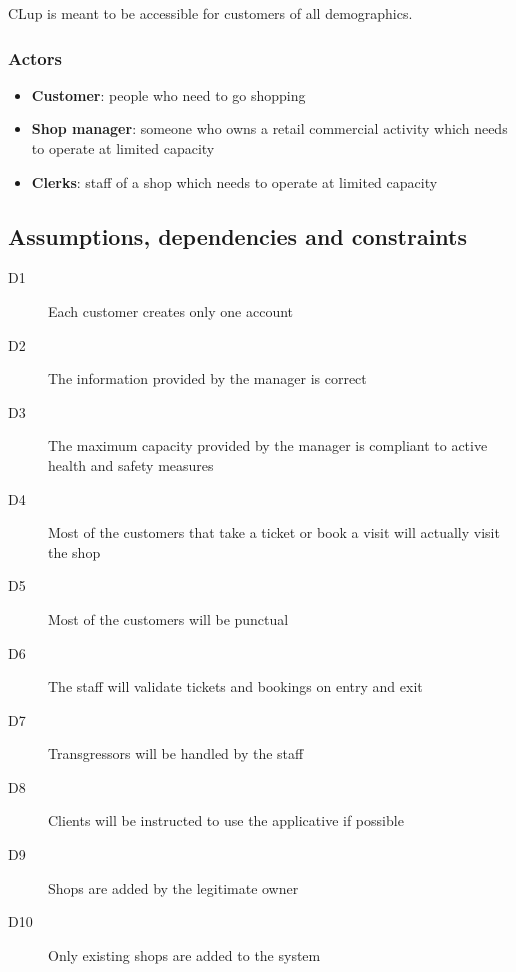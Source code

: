 CLup is meant to be accessible for customers of all demographics.

\subsubsection{Actors}
\begin{itemize}
    \item \textbf{Customer}: people who need to go shopping
    \item \textbf{Shop manager}: someone who owns a retail commercial activity which needs to operate at limited capacity
    \item \textbf{Clerks}: staff of a shop which needs to operate at limited capacity
\end{itemize}

\subsection{Assumptions, dependencies and constraints}
\begin{description}
    \item[D1] Each customer creates only one account
    \item[D2] The information provided by the manager is correct
    \item[D3] The maximum capacity provided by the manager is compliant to active health and safety measures
    \item[D4] Most of the customers that take a ticket or book a visit will actually visit the shop
    \item[D5] Most of the customers will be punctual
    \item[D6] The staff will validate tickets and bookings on entry and exit
    \item[D7] Transgressors will be handled by the staff
    \item[D8] Clients will be instructed to use the applicative if possible
    \item[D9] Shops are added by the legitimate owner
    \item[D10] Only existing shops are added to the system
\end{description}